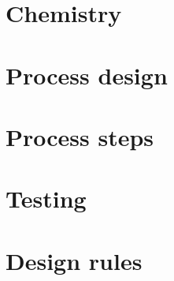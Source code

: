\documentclass[10pt,a4paper,oneside]{article}
\newcounter{ct}
\begin{document}
\section{Chemistry}


\newpage
\section{Process design}

\newpage




\newpage

\newpage

\newpage

\newpage

\newpage

\newpage

\newpage
\section{Process steps}
\label{process_overview}
\newpage

\newpage

\newpage

\newpage

\newpage

\newpage

\newpage

\newpage

\newpage

\newpage

\newpage


\newpage
\section{Testing}


\newpage
\section{Design rules}


\newpage
\listoffootnotes \cleardoublepage
\end{document}
